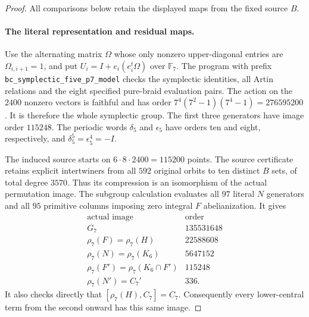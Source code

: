 \begin{proof}
All comparisons below retain the displayed maps from the
fixed source $B$.

\paragraph{The literal representation and residual maps.}
Use the alternating matrix $\Omega$ whose only nonzero
upper-diagonal entries are $\Omega_{i,i+1}=1$, and put
$U_i=I+e_i(e_i^t\Omega)$ over $\mathbb F_7$.
The program with prefix
\texttt{bc\_symplectic\_five\_p7\_model}
checks the symplectic identities, all Artin relations and the
eight specified pure-braid evaluation pairs.  The action on
the $2400$ nonzero vectors is faithful and has order
$7^4(7^2-1)(7^4-1)=276595200$.  It is therefore the whole
symplectic group.  The first three generators have image
order $115248$.  The periodic words $\delta_5$ and
$\epsilon_5$ have orders ten and eight, respectively, and
$\delta_5^5=\epsilon_5^4=-I$.

The induced source starts on $6\cdot8\cdot2400=115200$
points.  The source certificate retains explicit
intertwiners from all $592$ original orbits to ten distinct
$B$ sets, of total degree $3570$.  Thus its compression is
an isomorphism of the actual permutation image.  The
subgroup calculation evaluates all $97$ literal $N$
generators and all $95$ primitive columns imposing zero
integral $F$ abelianization.  It gives
\[
\begin{array}{c|r}
\text{actual image}&\text{order}\\\hline
G_7&135531648\\
\rho_7(F)=\rho_7(H)&22588608\\
\rho_7(N)=\rho_7(K_6)&5647152\\
\rho_7(F')=\rho_7(K_6\cap F')&115248\\
\rho_7(N')=C_7'&336.
\end{array}
\tag{E.51.8}
\]
It also checks directly that
$[\rho_7(H),C_7]=C_7$.  Consequently every lower-central
term from the second onward has this same image.


\end{proof}

